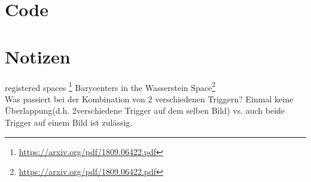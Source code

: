 \documentclass[11pt,a4paper]{article}
\numberwithin{equation}{section}
\begin{document}
	\section{Code}
	
	
	\section{Notizen}
	registered spaces \footnote{\url{https://arxiv.org/pdf/1809.06422.pdf}}
	Barycenters in the Wasserstein Space\footnote{\url{https://arxiv.org/pdf/1809.06422.pdf}}\\
	Was passiert bei der Kombination von 2 verschiedenen Triggern? Einmal keine Überlappung(d.h. 2verschiedene Trigger auf dem selben Bild) vs. auch beide Trigger auf einem Bild ist zulässig.
	\newpage
	
	\printglossaries
	
	\newpage
	
	
	
	
	
	
	
\end{document}
